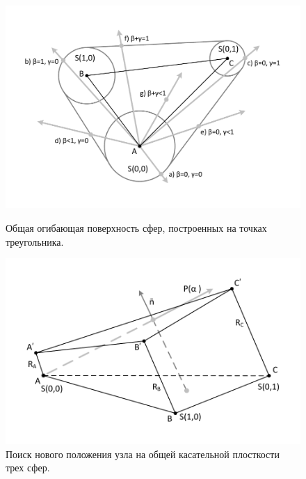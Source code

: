 \documentclass[
11pt,%
tightenlines,%
twoside,%
onecolumn,%
nofloats,%
nobibnotes,%
nofootinbib,%
superscriptaddress,%
noshowpacs,%
centertags]%
{revtex4}
\begin{document}
\begin{figure}
  \centering
  \begin{minipage}[b]{0.48\textwidth}
    \includegraphics[width=\textwidth]{pics/pic_general_envelope_size.pdf}
    \caption{Общая огибающая поверхность сфер, построенных на точках треугольника.}\label{fig:pic_general_envelope_size}
  \end{minipage}
  \hfill
  \begin{minipage}[b]{0.48\textwidth}
    \includegraphics[width=\textwidth]{pics/pic_general_envelope_2_size.pdf}
    \caption{Поиск нового положения узла на общей касательной плосткости трех сфер.}\label{fig:pic_general_envelope_2_size}
  \end{minipage}
\end{figure}
\end{document}
